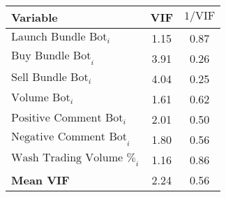 \begin{tabular}{lcc}
\hline
Variable & VIF & $1/\text{VIF}$ \\
\hline
$\text{Launch Bundle Bot}_{i}$ & 1.15 & 0.87 \\
$\text{Buy Bundle Bot}_{i}$ & 3.91 & 0.26 \\
$\text{Sell Bundle Bot}_{i}$ & 4.04 & 0.25 \\
$\text{Volume Bot}_{i}$ & 1.61 & 0.62 \\
$\text{Positive Comment Bot}_{i}$ & 2.01 & 0.50 \\
$\text{Negative Comment Bot}_{i}$ & 1.80 & 0.56 \\
$\text{Wash Trading Volume \%}_{i}$ & 1.16 & 0.86 \\
\hline
\textbf{Mean VIF} & 2.24 & 0.56 \\
\hline
\end{tabular}
